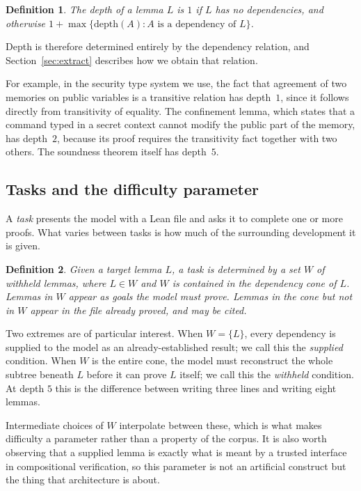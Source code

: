 \documentclass[11pt]{article}
\newtheorem{definition}{Definition}[section]
\begin{document}
\begin{definition}
The \emph{depth} of a lemma $L$ is $1$ if $L$ has no dependencies, and otherwise
$1 + \max\{\mathrm{depth}(A) : A \text{ is a dependency of } L\}$.
\end{definition}

Depth is therefore determined entirely by the dependency relation, and
Section~\ref{sec:extract} describes how we obtain that relation.

For example, in the security type system we use, the fact that agreement of two
memories on public variables is a transitive relation has depth~$1$, since it
follows directly from transitivity of equality. The confinement lemma, which
states that a command typed in a secret context cannot modify the public part of
the memory, has depth~$2$, because its proof requires the transitivity fact
together with two others. The soundness theorem itself has depth~$5$.

\subsection{Tasks and the difficulty parameter}

A \emph{task} presents the model with a Lean file and asks it to complete one or
more proofs. What varies between tasks is how much of the surrounding
development it is given.

\begin{definition}
Given a target lemma $L$, a task is determined by a set $W$ of \emph{withheld}
lemmas, where $L \in W$ and $W$ is contained in the dependency cone of $L$.
Lemmas in $W$ appear as goals the model must prove. Lemmas in the cone but not
in $W$ appear in the file already proved, and may be cited.
\end{definition}

Two extremes are of particular interest. When $W = \{L\}$, every dependency is
supplied to the model as an already-established result; we call this the
\emph{supplied} condition. When $W$ is the entire cone, the model must
reconstruct the whole subtree beneath $L$ before it can prove $L$ itself; we call
this the \emph{withheld} condition. At depth $5$ this is the difference between
writing three lines and writing eight lemmas.

Intermediate choices of $W$ interpolate between these, which is what makes
difficulty a parameter rather than a property of the corpus. It is also worth
observing that a supplied lemma is exactly what is meant by a trusted interface
in compositional verification, so this parameter is not an artificial construct
but the thing that architecture is about.
\end{document}
